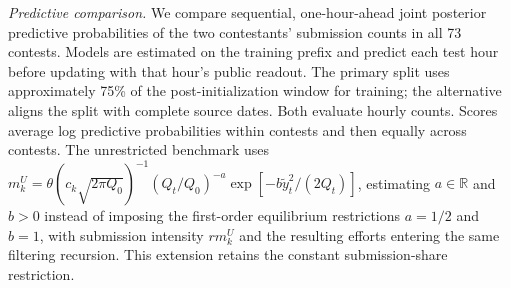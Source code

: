 \documentclass[mnsc]{informs3}
\begin{document}
\begin{APPENDICES}
\textit{Predictive comparison.} {We compare sequential, one-hour-ahead joint posterior predictive probabilities of the two contestants' submission counts in all 73 contests.} Models are estimated on the training prefix and predict each test hour before updating with that hour's public readout. The primary split uses approximately 75\% of the post-initialization window for training; the alternative aligns the split with complete source dates. Both evaluate hourly counts. Scores average log predictive probabilities within contests and then equally across contests.
The unrestricted benchmark uses $m_k^{U}=\theta(c_k\sqrt{2\pi Q_0})^{-1}(Q_t/Q_0)^{-a}\exp[-b\tilde y_t^2/(2Q_t)]$, estimating $a\in\mathbb R$ and $b>0$ instead of imposing the first-order equilibrium restrictions $a=1/2$ and $b=1$, with submission intensity $rm_k^{U}$ and the resulting efforts entering the same filtering recursion. {This extension retains the constant submission-share restriction.}


\end{APPENDICES}
\end{document}
